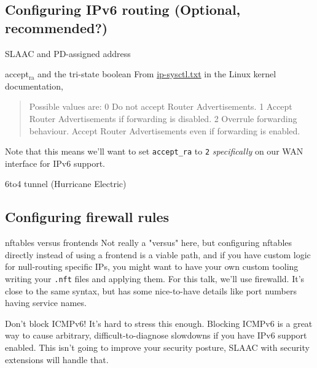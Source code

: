 \documentclass[bigger]{beamer}
\begin{document}
\subsection{Configuring IPv6 routing (Optional, recommended?)}
\label{sec:orgab512e8}

\begin{frame}[fragile,label={sec:orgf2a58cf}]{SLAAC and PD-assigned address}
 \begin{block}{accept\(_{\text{ra}}\) and the tri-state boolean}
From \href{https://www.kernel.org/doc/Documentation/networking/ip-sysctl.txt}{ip-sysctl.txt} in the Linux kernel documentation,
\begin{quote}
Possible values are:
    0 Do not accept Router Advertisements.
    1 Accept Router Advertisements if forwarding is disabled.
    2 Overrule forwarding behaviour. Accept Router Advertisements
      even if forwarding is enabled.
\end{quote}

Note that this means we'll want to set \texttt{accept\_ra} to \texttt{2} \emph{specifically} on our
WAN interface for IPv6 support.
\end{block}
\end{frame}

\begin{frame}[label={sec:orga4304bc}]{6to4 tunnel (Hurricane Electric)}
\end{frame}

\subsection{Configuring firewall rules}
\label{sec:org19a3785}

\begin{frame}[fragile,label={sec:org1530f3c}]{nftables versus frontends}
 Not really a "versus" here, but configuring nftables directly instead of using a
frontend is a viable path, and if you have custom logic for null-routing
specific IPs, you might want to have your own custom tooling writing your \texttt{.nft}
files and applying them. For this talk, we'll use firewalld. It's close to the
same syntax, but has some nice-to-have details like port numbers having service
names.
\end{frame}

\begin{frame}[label={sec:org9196245}]{Don't block ICMPv6!}
It's hard to stress this enough. Blocking ICMPv6 is a great way to cause
arbitrary, difficult-to-diagnose slowdowns if you have IPv6 support
enabled. This isn't going to improve your security posture, SLAAC with
security extensions will handle that.
\end{frame}
\end{document}
